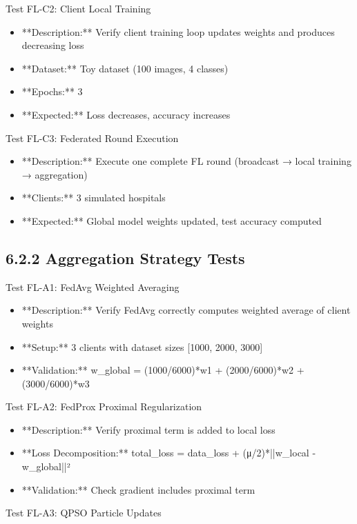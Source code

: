 Test FL-C2: Client Local Training

\begin{itemize}
  \item **Description:** Verify client training loop updates weights and produces decreasing loss
  \item **Dataset:** Toy dataset (100 images, 4 classes)
  \item **Epochs:** 3
  \item **Expected:** Loss decreases, accuracy increases
\end{itemize}

Test FL-C3: Federated Round Execution

\begin{itemize}
  \item **Description:** Execute one complete FL round (broadcast → local training → aggregation)
  \item **Clients:** 3 simulated hospitals
  \item **Expected:** Global model weights updated, test accuracy computed
\end{itemize}


\subsection{6.2.2 Aggregation Strategy Tests}
Test FL-A1: FedAvg Weighted Averaging

\begin{itemize}
  \item **Description:** Verify FedAvg correctly computes weighted average of client weights
  \item **Setup:** 3 clients with dataset sizes [1000, 2000, 3000]
  \item **Validation:** w\_global = (1000/6000)*w1 + (2000/6000)*w2 + (3000/6000)*w3
\end{itemize}

Test FL-A2: FedProx Proximal Regularization

\begin{itemize}
  \item **Description:** Verify proximal term is added to local loss
  \item **Loss Decomposition:** total\_loss = data\_loss + (μ/2)*||w\_local - w\_global||²
  \item **Validation:** Check gradient includes proximal term
\end{itemize}

Test FL-A3: QPSO Particle Updates

